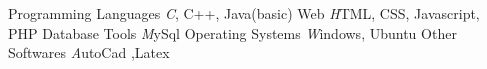 \begin{cvskills}

  \cvskill
  {Programming Languages}
  {\textit C, C++, Java(basic) \hspace{0.3cm}}
  \cvskill
  {Web}
  {\textit HTML, CSS, Javascript, PHP \hspace{0.3cm}}
  \cvskill
  {Database Tools}
  {\textit MySql \hspace{0.3cm}}
  \cvskill
  {Operating Systems}
  {\textit Windows, Ubuntu \hspace{0.3cm}}
  \cvskill
  {Other Softwares}
  {\textit AutoCad ,Latex \hspace{0.3cm}}
  
\end{cvskills}